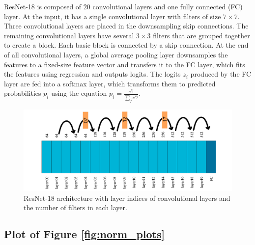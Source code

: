 \documentclass[runningheads]{llncs}
\begin{document}
ResNet-18 is composed of $20$ convolutional layers and one fully connected (FC) layer.
At the input, it has a single convolutional layer with filters of size $7\times 7$.
Three convolutional layers are placed in the downsampling skip connections. The
remaining convolutional layers have several $3\times 3$ filters that are grouped
together to create a block. Each basic block is connected by a skip connection. At the
end of all convolutional layers, a global average pooling layer downsamples the features
to a fixed-size feature vector and transfers it to the FC layer, which fits the features
using regression and outputs logits. The logits $z_i$ produced by the FC layer are fed
into a softmax layer, which transforms them to predicted probabilities $p_i$ using the
equation $p_i=\frac {e^{z_i}}{\sum _j e^{z_j}}$.


\begin{figure}[ht] \centering \includegraphics[width=0.96\columnwidth]{drawing}
\caption{ ResNet-18 architecture with layer indices of convolutional layers and the
number of filters in each layer. } \label{fig:resnet18} \end{figure}



\clearpage

\subsection{Plot of Figure \ref{fig:norm_plots}}
\label{sec:big_plots}
\end{document}
